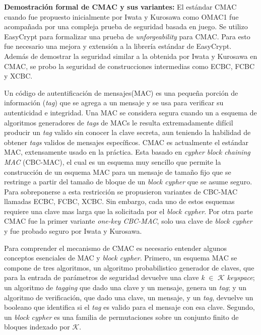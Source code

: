 \documentclass[runningheads]{llncs}
\begin{document}

\textbf{Demostración formal de CMAC y sus variantes\cite{ref_article6}:}
El estándar CMAC cuando fue propuesto inicialmente por Iwata y Kurosawa como OMAC1 fue acompañada por una compleja prueba de seguridad basada en juego. Se utilizo EasyCrypt para formalizar una prueba de \textit{unforgeability} para CMAC. Para esto fue necesario una mejora y extensión a la librería estándar de EasyCrypt. Además de demostrar la seguridad similar a la obtenida por Iwata y Kurosawa\cite{ref_article7} en CMAC, se probo la seguridad de construcciones intermedias como ECBC, FCBC y XCBC\cite{ref_article8}.

Un código de autentificación de mensajes(MAC) es una pequeña porción de información (\textit{tag}) que se agrega a un mensaje y se usa para verificar su autenticidad e integridad. Una MAC se considera segura cuando un a esquema de algoritmos generadores de \textit{tags} de MACs le resulta extremadamente difícil producir un \textit{tag} valido sin conocer la clave secreta, aun teniendo la habilidad de obtener \textit{tags} validos de mensajes específicos. CMAC es actualmente el estándar MAC, extensamente usado en la práctica. Esta basado en \textit{cypher block chaining MAC} (CBC-MAC), el cual es un esquema muy sencillo que permite la construcción de un esquema MAC para un mensaje de tamaño fijo que se restringe a partir del tamaño de bloque de un \textit{block cypher} que se asume seguro. Para sobreponerse a esta restricción se propusieron variantes de CBC-MAC llamadas ECBC, FCBC, XCBC. Sin embargo, cada uno de estos esquemas requiere una clave mas larga que la solicitada por el \textit{block cypher}. Por otra parte CMAC fue la primer variante \textit{one-key CBC-MAC}, solo usa clave de \textit{block cypher} y fue probado seguro por Iwata y Kurosawa.

Para comprender el mecanismo de CMAC es necesario entender algunos conceptos esenciales de MAC y \textit{block cypher}. Primero, un esquema MAC se compone de tres algoritmos, un algoritmo probabilistico generador de claves, que para la entrada de parámetros de seguridad devuelve una clave \textit{k} $\in$ $\mathcal{K}$ \textit{keyspace}; un algoritmo de \textit{tagging} que dado una clave y un mensaje, genera un \textit{tag}; y un algoritmo de verificación, que dado una clave, un mensaje, y un \textit{tag}, devuelve un booleano que identifica si el \textit{tag} es valido para el mensaje con esa clave. Segundo, un \textit{block cypher} es una familia de permutaciones sobre un conjunto finito de bloques indexado por $\mathcal{K}$.
\end{document}
